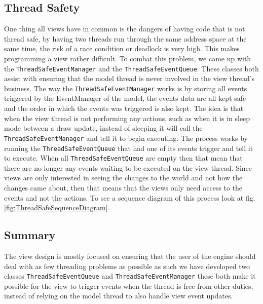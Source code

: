 \subsection*{Thread Safety}

One thing all views have in common is the dangers of having code that
is not thread safe, by having two threads run through the same address
space at the same time, the risk of a race condition or deadlock is
very high. This makes programming a view rather difficult. To combat
this problem, we came up with the \texttt{ThreadSafeEventManager}
and the \texttt{ThreadSafeEventQueue}. These classes both assist with
ensuring that the model thread is never involved in the view thread\textquoteright{}s
business. The way the \texttt{ThreadSafeEventManager} works is by
storing all events triggered by the EventManager of the model, the
events data are all kept safe and the order in which the events was
triggered is also kept. The idea is that when the view thread is not
performing any actions, such as when it is in sleep mode between a
draw update, instead of sleeping it will call the \texttt{ThreadSafeEventManager}
and tell it to begin executing. The process works by running the \texttt{ThreadSafeEventQueue}
that had one of its events trigger and tell it to execute. When all
\texttt{ThreadSafeEventQueue} are empty then that mean that there
are no longer any events waiting to be executed on the view thread.
Since views are only interested in seeing the changes to the world
and not how the changes came about, then that means that the views
only need access to the events and not the actions. To see a sequence
diagram of this process look at fig. \ref{fig:ThreadSafeSequenceDiagram}.


\subsection*{Summary}

The view design is mostly focused on ensuring that the user of the
engine should deal with as few threading problems as possible as such
we have developed two classes \texttt{ThreadSafeEventQueue} and \texttt{ThreadSafeEventManager}
these both make it possible for the view to trigger events when the
thread is free from other duties, instead of relying on the model
thread to also handle view event updates. 
